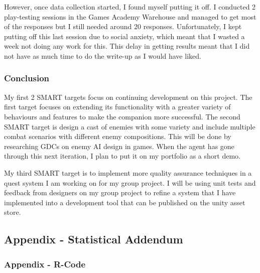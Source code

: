 \documentclass{IEEEtran}
\begin{document}
However, once data collection started, I found myself putting it off. I conducted 2 play-testing sessions in the Games Academy Warehouse and managed to get most of the responses but I still needed around 20 responses. Unfortunately, I kept putting off this last session due to social anxiety, which meant that I wasted a week not doing any work for this. This delay in getting results meant that I did not have as much time to do the write-up as I would have liked.

\subsubsection{Conclusion}

My first 2 SMART targets focus on continuing development on this project. The first target focuses on extending its functionality with a greater variety of behaviours and features to make the companion more successful. The second SMART target is design a cast of enemies with some variety and include multiple combat scenarios with different enemy compositions. This will be done by researching GDCs on enemy AI design in games. When the agent has gone through this next iteration, I plan to put it on my portfolio as a short demo.

My third SMART target is to implement more quality assurance techniques in a quest system I am working on for my group project. I will be using unit tests and feedback from designers on my group project to refine a system that I have implemented into a development tool that can be published on the unity asset store.

\newpage

\subsection{Appendix - Statistical Addendum}
\label{AppendixStatistics}

\subsubsection{Appendix - R-Code}
\label{AppendixRCode}
\end{document}
